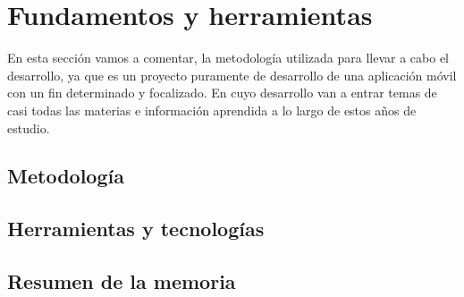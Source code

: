 \section{Fundamentos y herramientas}
\setlength{\parskip}{0.5cm}

En esta sección vamos a comentar, la metodología utilizada para llevar a cabo el desarrollo, ya que es un proyecto puramente de desarrollo de una aplicación móvil con un fin determinado y focalizado. En cuyo desarrollo van a entrar temas de casi todas las materias e información aprendida a lo largo de estos años de estudio.

\subsection{Metodología}\label{sec:metodologia}


\subsection{Herramientas y tecnologías}


\subsection{Resumen de la memoria}
